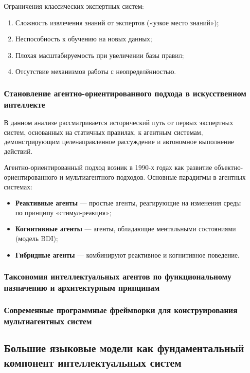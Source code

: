 \documentclass{syksu-coursework}
\begin{document}
Ограничения классических экспертных систем:

\begin{enumerate}
    \item Сложность извлечения знаний от экспертов («узкое место знаний»);
    \item Неспособность к обучению на новых данных;
    \item Плохая масштабируемость при увеличении базы правил;
    \item Отсутствие механизмов работы с неопределённостью.
\end{enumerate}

\subsubsection{Становление агентно-ориентированного подхода в искусственном интеллекте}

В данном анализе рассматривается исторический путь от первых экспертных систем, основанных на статичных правилах, к агентным системам, демонстрирующим целенаправленное рассуждение и автономное выполнение действий.

Агентно-ориентированный подход возник в 1990-х годах как развитие объектно-ориентированного и мультиагентного подходов. Основные парадигмы в агентных системах:

\begin{itemize}
    \item \textbf{Реактивные агенты} — простые агенты, реагирующие на изменения среды по принципу «стимул-реакция»;
    \item \textbf{Когнитивные агенты} — агенты, обладающие ментальными состояниями (модель BDI);
    \item \textbf{Гибридные агенты} — комбинируют реактивное и когнитивное поведение.
\end{itemize}

\subsubsection{Таксономия интеллектуальных агентов по функциональному назначению и архитектурным принципам}

\subsubsection{Современные программные фреймворки для конструирования мультиагентных систем}

\subsection{Большие языковые модели как фундаментальный компонент интеллектуальных систем}
\end{document}
